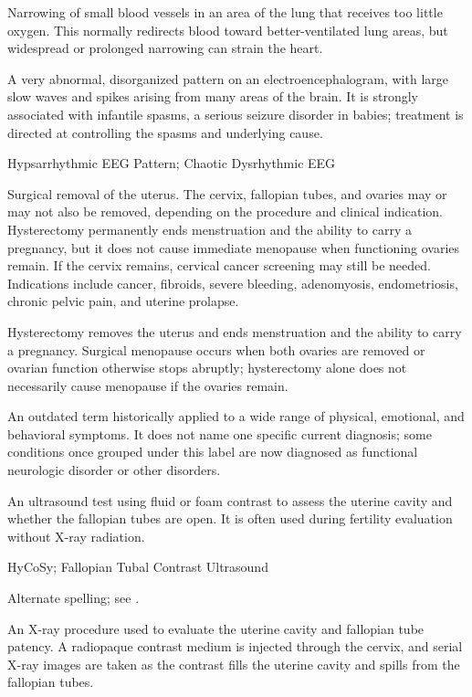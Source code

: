  Narrowing of small blood vessels in an area of the lung that receives too little oxygen. This normally redirects blood toward better-ventilated lung areas, but widespread or prolonged narrowing can strain the heart.

 A very abnormal, disorganized pattern on an electroencephalogram, with large slow waves and spikes arising from many areas of the brain. It is strongly associated with infantile spasms, a serious seizure disorder in babies; treatment is directed at controlling the spasms and underlying cause.

\synonyms
Hypsarrhythmic EEG Pattern; Chaotic Dysrhythmic EEG

 Surgical removal of the uterus. The cervix, fallopian tubes, and ovaries may or may not also be removed, depending on the procedure and clinical indication. Hysterectomy permanently ends menstruation and the ability to carry a pregnancy, but it does not cause immediate menopause when functioning ovaries remain. If the cervix remains, cervical cancer screening may still be needed. Indications include cancer, fibroids, severe bleeding, adenomyosis, endometriosis, chronic pelvic pain, and uterine prolapse.

 Hysterectomy removes the uterus and ends menstruation and the ability to carry a pregnancy. Surgical menopause occurs when both ovaries are removed or ovarian function otherwise stops abruptly; hysterectomy alone does not necessarily cause menopause if the ovaries remain.

 An outdated term historically applied to a wide range of physical, emotional, and behavioral symptoms. It does not name one specific current diagnosis; some conditions once grouped under this label are now diagnosed as functional neurologic disorder or other disorders.

 An ultrasound test using fluid or foam contrast to assess the uterine cavity and whether the fallopian tubes are open. It is often used during fertility evaluation without X-ray radiation.

\synonyms
HyCoSy; Fallopian Tubal Contrast Ultrasound

 Alternate spelling; see .

 An X-ray procedure used to evaluate the uterine cavity and fallopian tube patency. A
radiopaque contrast medium is injected through the cervix, and serial X-ray images are
taken as the contrast fills the uterine cavity and spills from the fallopian tubes.

